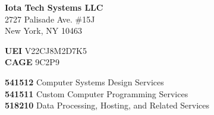 \documentclass[11pt]{developercv} %
\begin{document}
\begin{minipage}[t]{0.3\textwidth}
	\vspace{-\baselineskip} %

	
	\textbf{Iota Tech Systems LLC}\\
	2727 Palisade Ave. \#15J\\
	New York, NY 10463
\end{minipage}
\hfill
\begin{minipage}[t]{0.3\textwidth}
	\vspace{-\baselineskip} %
	
	
	\textbf{UEI} V22CJ8M2D7K5\\
    \textbf{CAGE} 9C2P9
\end{minipage}
\hfill
\begin{minipage}[t]{0.3\textwidth}
	\vspace{-\baselineskip} %
	
	
    \textbf{541512} Computer Systems Design Services\\
    \textbf{541511} Custom Computer Programming Services\\
    \textbf{518210} Data Processing, Hosting, and Related Services

\end{minipage}

\end{document}
